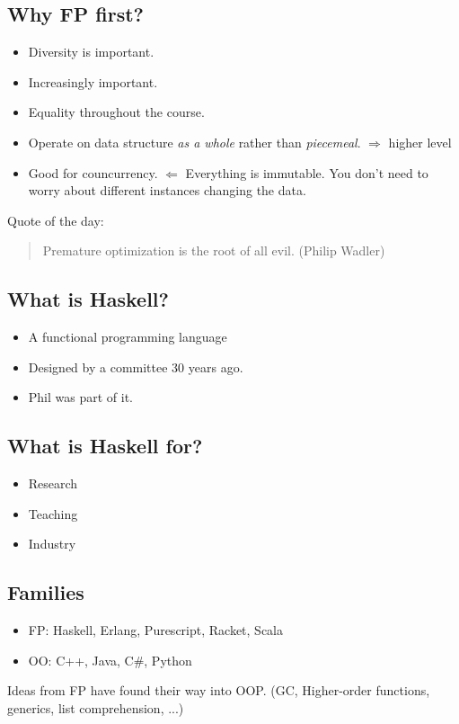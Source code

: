 \documentclass{article}
\begin{document}
\subsection{Why FP first?}
\begin{itemize}
	\item Diversity is important.
	\item Increasingly important.
	\item Equality throughout the course.
	\item Operate on data structure \emph{as a whole} rather than \emph{piecemeal}. $\Rightarrow$ higher level
	\item Good for councurrency.
	      $\Leftarrow$ Everything is immutable.
	      You don't need to worry about different instances changing the data.
\end{itemize}
Quote of the day:
\begin{quotation}
	Premature optimization is the root of all evil.
	(Philip Wadler)
\end{quotation}
\subsection{What is Haskell?}
\begin{itemize}
	\item A functional programming language
	\item Designed by a committee 30 years ago.
	\item Phil was part of it.
\end{itemize}
\subsection{What is Haskell for?}
\begin{itemize}
	\item Research
	\item Teaching
	\item Industry
\end{itemize}
\subsection{Families}
\begin{itemize}
	\item FP: Haskell, Erlang, Purescript, Racket, Scala
	\item OO: C++, Java, C\#, Python
\end{itemize}
Ideas from FP have found their way into OOP. (GC, Higher-order functions, generics, list comprehension, ...)
\end{document}
